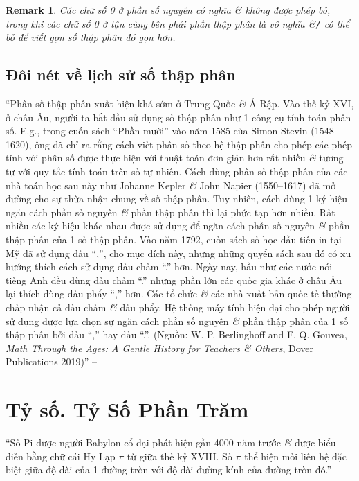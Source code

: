\documentclass[oneside]{book}
\numberwithin{equation}{section}
\newtheorem{remark}{Remark}[section]
\begin{document}
\begin{remark}
	Các chữ số 0 ở phần số nguyên có nghĩa \textit{\&} không được phép bỏ, trong khi các chữ số 0 ở tận cùng bên phải phần thập phân là vô nghĩa \&\emph{\texttt{/}} có thể bỏ để viết gọn số thập phân đó gọn hơn.
\end{remark}

\subsection{Đôi nét về lịch sử số thập phân}
``Phân số thập phân xuất hiện khá sớm ở Trung Quốc \textit{\&} Ả Rập. Vào thế kỷ XVI, ở châu Âu, người ta bắt đầu sử dụng số thập phân như 1 công cụ tính toán phân số. E.g., trong cuốn sách ``Phần mười'' vào năm 1585 của Simon Stevin (1548--1620), ông đã chỉ ra rằng cách viết phân số theo hệ thập phân cho phép các phép tính với phân số được thực hiện với thuật toán đơn giản hơn rất nhiều \textit{\&} tương tự với quy tắc tính toán trên số tự nhiên. Cách dùng phân số thập phân của các nhà toán học sau này như Johanne Kepler \textit{\&} John Napier (1550--1617) đã mở đường cho sự thừa nhận chung về số thập phân. Tuy nhiên, cách dùng 1 ký hiệu ngăn cách phần số nguyên \textit{\&} phần thập phân thì lại phức tạp hơn nhiều. Rất nhiều các ký hiệu khác nhau được sử dụng để ngăn cách phần số nguyên \textit{\&} phần thập phân của 1 số thập phân. Vào năm 1792, cuốn sách số học đầu tiên in tại Mỹ đã sử dụng dấu ``,'', cho mục đích này, nhưng những quyển sách sau đó có xu hướng thích cách sử dụng dấu chấm ``.'' hơn. Ngày nay, hầu như các nước nói tiếng Anh đều dùng dấu chấm ``.'' nhưng phần lớn các quốc gia khác ở châu Âu lại thích dùng dấu phẩy ``,'' hơn. Các tổ chức \textit{\&} các nhà xuất bản quốc tế thường chấp nhận cả dấu chấm \textit{\&} dấu phẩy. Hệ thống máy tính hiện đại cho phép người sử dụng được lựa chọn sự ngăn cách phần số nguyên \textit{\&} phần thập phân của 1 số thập phân bởi dấu ``,'' hay dấu ``.''. (Nguồn: W. P. Berlinghoff and F. Q. Gouvea, \textit{Math Through the Ages: A Gentle History for Teachers \textit{\&} Others}, Dover Publications 2019)'' -- \cite[p. 60]{Thai_Anh_Dat_Ha_Loan_Nam_Quang_Toan_6_tap_2}

\section{Tỷ số. Tỷ Số Phần Trăm}
``Số Pi được người Babylon cổ đại phát hiện gần 4000 năm trước \textit{\&} được biểu diễn bằng chữ cái Hy Lạp $\pi$ từ giữa thế kỷ XVIII. Số $\pi$ thể hiện mối liên hệ đặc biệt giữa độ dài của 1 đường tròn với độ dài đường kính của đường tròn đó.'' -- \cite[p. 61]{Thai_Anh_Dat_Ha_Loan_Nam_Quang_Toan_6_tap_2}
\end{document}
